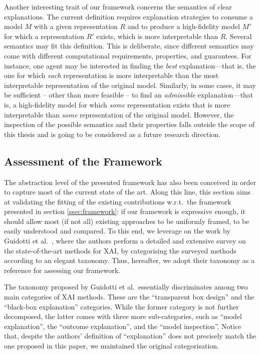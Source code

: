\documentclass[12pt,a4paper,openright,twoside]{book}
\begin{document}
Another interesting trait of our framework concerns the semantics of clear explanations.
%
The current definition requires explanation strategies to consume a model $M$ with a given representation $R$ and to produce a high-fidelity model $M'$ for which a representation $R'$ exists, which is more interpretable than $R$.
%
Several semantics may fit this definition.
%
This is deliberate, since different semantics may come with different computational requirements, properties, and guarantees.
%
For instance, one agent may be interested in finding the \emph{best} explanation---that is, the one for which \emph{each} representation is more interpretable than the most interpretable representation of the original model.
%
Similarly, in some cases, it may be sufficient -- other than more feasible -- to find an \emph{admissible} explanation---that is, a high-fidelity model for which \emph{some} representation exists that is more interpretable than \emph{some} representation of the original model.
%
However, the inspection of the possible semantics and their properties falls outside the scope of this thesis and is going to be considered as a future research direction.

\subsection{Assessment of the Framework}\label{sec:validation}

The abstraction level of the presented framework has also been conceived in order to capture most of the current state of the art.
%
Along this line, this section aims at validating the fitting of the existing contributions w.r.t.\ the framework presented in section \cref{ssec:framework}: if our framework is expressive enough, it should allow most (if not all) existing approaches to be uniformly framed, to be easily understood and compared.
%
To this end, we leverage on the work by Guidotti et al.\ \cite{GuidottiMRTGP19}, where the authors perform a detailed and extensive survey on the state-of-the-art methods for XAI, by categorising the surveyed methods according to an elegant taxonomy.
%
Thus, hereafter, we adopt their taxonomy as a reference for assessing our framework.

The taxonomy proposed by Guidotti et al.\ essentially discriminates among two main categories of XAI methods.
%
These are the ``transparent box design'' and the ``black-box explanation'' categories.
%
While the former category is not further decomposed, the latter comes with three more sub-categories, such as ``model explanation'', the ``outcome explanation'', and the ``model inspection''.
%
Notice that, despite the authors' definition of ``explanation'' does not precisely match the one proposed in this paper, we maintained the original categorisation.
\end{document}
